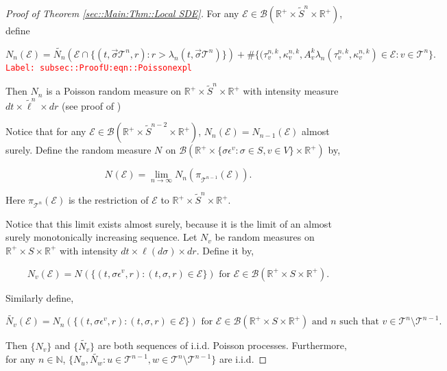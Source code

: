 \documentclass[12pt]{article}
\newcommand{\mb}{\mathbb}
\newcommand{\mc}{\mathcal}
\newcommand{\ms}{\mathscr}
\newcommand{\ra}{\rightarrow}
\newcommand{\te}{\text}
\newcommand{\ep}{\epsilon}
\newcommand{\tr}{\textcolor{red}}
\newcommand{\labe}[1]{\tr{\texttt{Label: #1}}}
\newcommand{\ind}{\hspace{24pt}}
\renewcommand{\v}{v}							%
\newcommand{\vv}{u}								%
\newcommand{\vvv}{w}							%
\renewcommand{\S}{S}							%
\newcommand{\s}{\sigma}							%
\newcommand{\sv}{\vec{\s}}						%
\newcommand{\ev}[1]{\ep^{#1}}					%
\renewcommand{\t}{t}							%
\newcommand{\poiss}[1]{N_{#1}}						%
\newcommand{\pup}[1]{^{#1}}							%
\newcommand{\tree}{\mc{T}}							%
\newcommand{\V}{V}									%
\renewcommand{\r}{r}								%
\newcommand{\rt}[1]{\tau^{#1}}						%
\renewcommand{\it}{k}								%
\newcommand{\numb}{n}								%
\newcommand{\XState}[1]{\S^{#1}}				%
\newcommand{\piV}[2]{\pi_{#1}^{#2}}					%
\newcommand{\rate}[1]{\lambda_{#1}}					%
\newcommand{\Sm}{\ell}								%
\newcommand{\alt}{\widetilde}						%
\newcommand{\rv}{A}								%
\newcommand{\evnt}{\mc{E}}						%
\renewcommand{\mark}[1]{\kappa^{#1}}				%
\begin{document}
\begin{proof}[Proof of Theorem \ref{sec::Main:Thm::Local SDE}]
For any \(\evnt \in \ms{B}(\mb{R}^+\times\alt{\S}^\numb\times\mb{R}^+)\), define

\begin{equation}
\poiss{\numb}(\evnt) = \alt{\poiss{\numb}}\left(\evnt\cap\{(t,\sv{\tree\pup{\numb}},\r):\r > \rate{\numb}(\t,\sv{\tree\pup{\numb}})\}\right) + \#\{(\rt{\numb,\it}_\v,\mark{\numb,\it}_\v,\rv_{\v}^{\it}\rate{\numb}(\rt{\numb,\it}_\v,\mark{\numb,\it}_\v) \in \evnt: \v\in \tree\pup{\numb}\}.
\label{subsec::ProofU:eqn::Poissonexpl}
\end{equation}
\labe{subsec::ProofU:eqn::Poissonexpl}

Then \(\poiss{\numb}\) is a Poisson random measure on \(\mb{R}^+\times\alt{\S}^\numb\times \mb{R}^+\) with intensity measure \(d\t\times \alt{\Sm}^\numb\times d\r\) (see proof of \cite[Theorem 14.7.1(b)]{DalVer08})

\ind Notice that for any \(\evnt \in \ms{B}(\mb{R}^+\times \alt{\S}^{\numb-2}\times \mb{R}^+)\), \(\poiss{\numb}(\evnt) = \poiss{\numb-1}(\evnt)\) almost surely. Define the random measure \(\poiss{}\) on \(\ms{B}(\mb{R}^+\times \{\s\ev{\v}:\s\in \S,\v \in \V\}\times \mb{R}^+)\) by,

\[\poiss{}(\evnt) = \lim_{\numb \ra\infty}\poiss{\numb}\left(\piV{\tree\pup{\numb-1}}{}(\evnt)\right).\]

Here \(\piV{\tree\pup{\numb}}{}(\evnt)\) is the restriction of \(\evnt\) to \(\mb{R}^+\times \alt{\S}^\numb\times\mb{R}^+\). 

\ind Notice that this limit exists almost surely, because it is the limit of an almost surely monotonically increasing sequence. Let \(\poiss{\v}\) be random measures on \(\mb{R}^+\times\S\times\mb{R}^+\) with intensity \(d\t\times\Sm(d\s)\times d\r\). Define it by,

\[\poiss{\v}(\evnt) = \poiss{}\left(\{(\t,\s\ev{\v},\r):(\t,\s,\r)\in \evnt\}\right) \te{ for } \evnt \in \ms{B}(\mb{R}^+\times\S\times\mb{R}^+).\]

Similarly define,

\[\alt{\poiss{\v}}(\evnt) = \poiss{\numb}\left(\{(\t,\s\ev{\v},\r):(\t,\s,\r)\in \evnt\}\right)\te{ for } \evnt \in \ms{B}(\mb{R}^+\times\S\times\mb{R}^+)\te{ and }\numb\te{ such that } \v\in \tree\pup{\numb}\setminus\tree\pup{\numb-1}.\]

Then \(\{\poiss{\v}\}\) and \(\{\alt{\poiss{\v}}\}\) are both sequences of i.i.d. Poisson processes. Furthermore, for any \(\numb \in \mb{N}\), \(\{\poiss{\vv},\alt{\poiss{\vvv}}:\vv\in \tree\pup{\numb-1},\vvv\in\tree\pup{\numb}\setminus\tree\pup{\numb-1}\}\) are i.i.d.


\end{proof}
\end{document}
